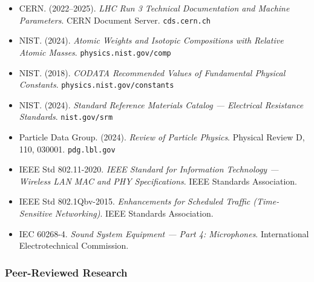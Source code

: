\documentclass[11pt,letterpaper]{article}
\begin{document}
\begin{itemize}[leftmargin=*]
  \item CERN. (2022--2025). \textit{LHC Run 3 Technical Documentation and Machine Parameters}. CERN Document Server. \texttt{cds.cern.ch}
  \item NIST. (2024). \textit{Atomic Weights and Isotopic Compositions with Relative Atomic Masses}. \texttt{physics.nist.gov/comp}
  \item NIST. (2018). \textit{CODATA Recommended Values of Fundamental Physical Constants}. \texttt{physics.nist.gov/constants}
  \item NIST. (2024). \textit{Standard Reference Materials Catalog --- Electrical Resistance Standards}. \texttt{nist.gov/srm}
  \item Particle Data Group. (2024). \textit{Review of Particle Physics}. Physical Review D, 110, 030001. \texttt{pdg.lbl.gov}
  \item IEEE Std 802.11-2020. \textit{IEEE Standard for Information Technology --- Wireless LAN MAC and PHY Specifications}. IEEE Standards Association.
  \item IEEE Std 802.1Qbv-2015. \textit{Enhancements for Scheduled Traffic (Time-Sensitive Networking)}. IEEE Standards Association.
  \item IEC 60268-4. \textit{Sound System Equipment --- Part 4: Microphones}. International Electrotechnical Commission.
\end{itemize}

\subsubsection{Peer-Reviewed Research}
\end{document}
